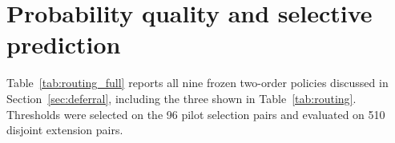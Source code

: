 \documentclass[11pt]{article}
\begin{document}
\section{Probability quality and selective prediction}
\label{app:confidence}
Table~\ref{tab:routing_full} reports all nine frozen two-order policies discussed in Section~\ref{sec:deferral}, including the three shown in Table~\ref{tab:routing}. Thresholds were selected on the 96 pilot selection pairs and evaluated on 510 disjoint extension pairs.
\begin{apptable}
\centering\small\setlength{\tabcolsep}{3pt}

\caption{Frozen two-order JEV policies on 510 extension preference pairs. $\Delta$ is cascade-minus-fallback accuracy, with a 95\% paired cluster interval. Fee ratios include both JEV orders: reported usage / conservative upper ratio. $\tau=0.5$ accepts every pair and makes no fallback call. Results are offline simulations.}
\label{tab:routing_full}
\end{apptable}
\end{document}
